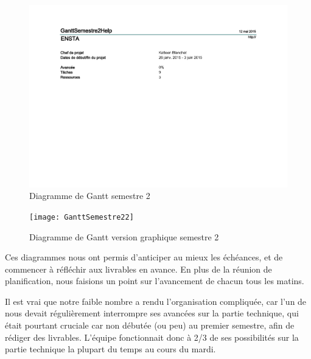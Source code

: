 \begin{figure}[H]
  \centering
  \includegraphics[scale=1]{GanttSemestre2}
  \caption{Diagramme de Gantt semestre 2}
  \label{fig:GanttSemestre2}
\end{figure}

\begin{figure}[H]
  \centering
  \texttt{[image: GanttSemestre22]}
  \caption{Diagramme de Gantt version graphique semestre 2}
  \label{fig:GanttSemestre22}
\end{figure}

Ces diagrammes nous ont permis d’anticiper au mieux les échéances, et de commencer à réfléchir aux livrables en avance. En plus de la réunion de planification, nous faisions un point sur l’avancement de chacun tous les matins.

Il est vrai que notre faible nombre a rendu l’organisation compliquée, car l’un de nous devait régulièrement interrompre ses avancées sur la partie technique, qui était pourtant cruciale car non débutée (ou peu) au premier semestre, afin de rédiger des livrables. L’équipe fonctionnait donc à 2/3 de ses possibilités sur la partie technique la plupart du temps au cours du mardi.